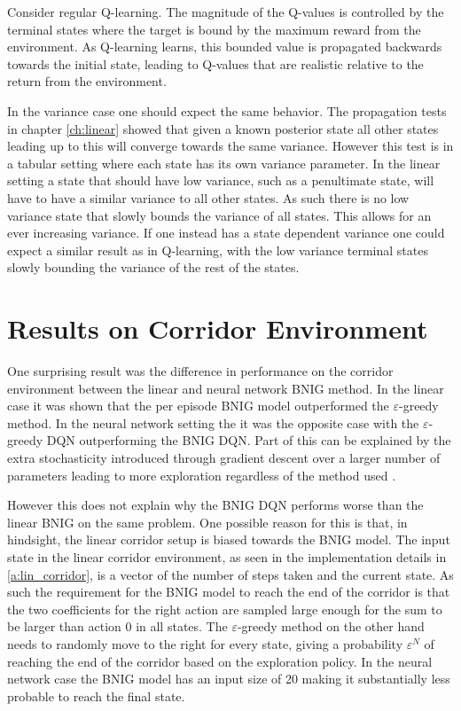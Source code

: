 Consider regular Q-learning. The magnitude of the Q-values is controlled by the terminal states where the target is bound by the maximum reward from the environment. As Q-learning learns, this bounded value is propagated backwards towards the initial state, leading to Q-values that are realistic relative to the return from the environment.

In the variance case one should expect the same behavior. The propagation tests in chapter \ref{ch:linear} showed that given a known posterior state all other states leading up to this will converge towards the same variance. However this test is in a tabular setting where each state has its own variance parameter. In the linear setting a state that should have low variance, such as a penultimate state, will have to have a similar variance to all other states. As such there is no low variance state that slowly bounds the variance of all states. This allows for an ever increasing variance. If one instead has a state dependent variance one could expect a similar result as in Q-learning, with the low variance terminal states slowly bounding the variance of the rest of the states.

\section{Results on Corridor Environment}

One surprising result was the difference in performance on the corridor environment between the linear and neural network BNIG method. In the linear case it was shown that the per episode BNIG model outperformed the $\varepsilon$-greedy method. In the neural network setting the it was the opposite case with the $\varepsilon$-greedy DQN outperforming the BNIG DQN. Part of this can be explained by the extra stochasticity introduced through gradient descent over a larger number of parameters leading to more exploration regardless of the method used \citep{carlos_2018}. 

However this does not explain why the BNIG DQN performs worse than the linear BNIG on the same problem. One possible reason for this is that, in hindsight, the linear corridor setup is biased towards the BNIG model. The input state in the linear corridor environment, as seen in the implementation details in \ref{a:lin_corridor}, is a vector of the number of steps taken and the current state. As such the requirement for the BNIG model to reach the end of the corridor is that the two coefficients for the right action are sampled large enough for the sum to be larger than action 0 in all states. The $\varepsilon$-greedy method on the other hand needs to randomly move to the right for every state, giving a probability $\varepsilon^N$ of reaching the end of the corridor based on the exploration policy. In the neural network case the BNIG model has an input size of 20 making it substantially less probable to reach the final state.

